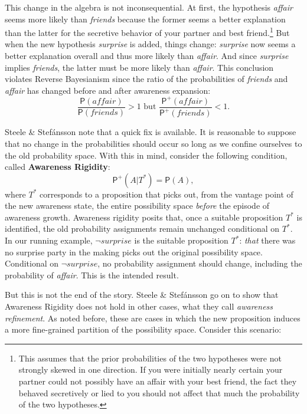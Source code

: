 \documentclass[
  11pt,
  dvipsnames,enabledeprecatedfontcommands, todos]{scrartcl}
\newcommand{\pr}[1]{\ensuremath{\mathsf{P}(#1)}}
\newcommand{\ppr}[2]{\ensuremath{\mathsf{P}^{#1}(#2)}}
\begin{document}
This change in the algebra is not inconsequential. At first, the
hypothesis \textit{affair} seems more likely than \textit{friends}
because the former seems a better explanation than the latter for the
secretive behavior of your partner and best friend.\footnote{This
  assumes that the prior probabilities of the two hypotheses were not
  strongly skewed in one direction. If you were initially nearly certain
  your partner could not possibly have an affair with your best friend,
  the fact they behaved secretively or lied to you should not affect
  that much the probability of the two hypotheses.} But when the new
hypothesis \textit{surprise} is added, things change: \textit{surprise}
now seems a better explanation overall and thus more likely than
\textit{affair}. And since \textit{surprise} implies \textit{friends},
the latter must be more likely than \textit{affair}. This conclusion
violates Reverse Bayesianism since the ratio of the probabilities of
\textit{friends} and \textit{affair} has changed before and after
awareness expansion:
\[\frac{\pr{\textit{affair}}}{ \pr{\textit{friends}}}>1 \text{ but } \frac{\ppr{+}{\textit{affair}}}{ \ppr{+}{\textit{friends}}}<1.\]

Steele \& Stefánsson note that a quick fix is available. It is
reasonable to suppose that no change in the probabilities should occur
so long as we confine ourselves to the old probability space. With this
in mind, consider the following condition, called
\textbf{Awareness Rigidity}: \[\ppr{+}{A \vert T^*}=\pr{A},\] where
\(T^*\) corresponds to a proposition that picks out, from the vantage
point of the new awareness state, the entire possibility space
\emph{before} the episode of awareness growth. Awareness rigidity posits
that, once a suitable proposition \(T^*\) is identified, the old
probability assignments remain unchanged conditional on \(T^*\). In our
running example, \(\neg\textit{surprise}\) is the suitable proposition
\(T^*\): \emph{that} there was no surprise party in the making picks out
the original possibility space. Conditional on
\(\neg\textit{surprise}\), no probability assignment should change,
including the probability of \textit{affair}. This is the intended
result.

But this is not the end of the story. Steele \& Stefánsson go on to show
that Awareness Rigidity does not hold in other cases, what they call
\emph{awareness refinement}. As noted before, these are cases in which
the new proposition induces a more fine-grained partition of the
possibility space. Consider this scenario:
\end{document}
